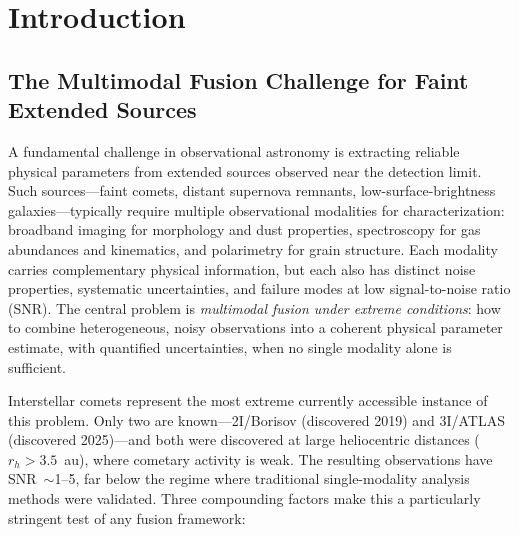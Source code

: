 \documentclass[usenatbib]{mnras}
\begin{document}
\section{Introduction}\label{sec:intro}

\subsection{The Multimodal Fusion Challenge for Faint Extended Sources}

A fundamental challenge in observational astronomy is extracting reliable physical parameters from extended sources observed near the detection limit. Such sources---faint comets, distant supernova remnants, low-surface-brightness galaxies---typically require multiple observational modalities for characterization: broadband imaging for morphology and dust properties, spectroscopy for gas abundances and kinematics, and polarimetry for grain structure. Each modality carries complementary physical information, but each also has distinct noise properties, systematic uncertainties, and failure modes at low signal-to-noise ratio (SNR). The central problem is \textit{multimodal fusion under extreme conditions}: how to combine heterogeneous, noisy observations into a coherent physical parameter estimate, with quantified uncertainties, when no single modality alone is sufficient.

Interstellar comets represent the most extreme currently accessible instance of this problem. Only two are known---2I/Borisov (discovered 2019) and 3I/ATLAS (discovered 2025)---and both were discovered at large heliocentric distances ($r_h > 3.5$~au), where cometary activity is weak. The resulting observations have SNR~$\sim$1--5, far below the regime where traditional single-modality analysis methods were validated. Three compounding factors make this a particularly stringent test of any fusion framework:
\end{document}

